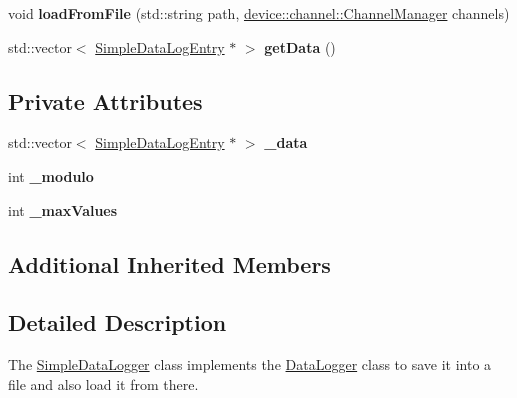 \begin{DoxyCompactItemize}
\item 
\hypertarget{classdrobot_1_1datalogger_1_1SimpleDataLogger_ae99d6654f53748fbf22835f75bca978f}{void {\bfseries load\-From\-File} (std\-::string path, \hyperlink{classdrobot_1_1device_1_1channel_1_1ChannelManager}{device\-::channel\-::\-Channel\-Manager} channels)}\label{classdrobot_1_1datalogger_1_1SimpleDataLogger_ae99d6654f53748fbf22835f75bca978f}

\item 
\hypertarget{classdrobot_1_1datalogger_1_1SimpleDataLogger_a9a22c15bff8f3faaaed8ebe32f95d4d1}{std\-::vector$<$ \hyperlink{structdrobot_1_1datalogger_1_1SimpleDataLogEntry}{Simple\-Data\-Log\-Entry} $\ast$ $>$ {\bfseries get\-Data} ()}\label{classdrobot_1_1datalogger_1_1SimpleDataLogger_a9a22c15bff8f3faaaed8ebe32f95d4d1}

\end{DoxyCompactItemize}
\subsection*{Private Attributes}
\begin{DoxyCompactItemize}
\item 
\hypertarget{classdrobot_1_1datalogger_1_1SimpleDataLogger_a3163664f8050b0a428f61c4c8849cb15}{std\-::vector$<$ \hyperlink{structdrobot_1_1datalogger_1_1SimpleDataLogEntry}{Simple\-Data\-Log\-Entry} $\ast$ $>$ {\bfseries \-\_\-data}}\label{classdrobot_1_1datalogger_1_1SimpleDataLogger_a3163664f8050b0a428f61c4c8849cb15}

\item 
\hypertarget{classdrobot_1_1datalogger_1_1SimpleDataLogger_af2603933a4ed7fb1231896fbee220752}{int {\bfseries \-\_\-modulo}}\label{classdrobot_1_1datalogger_1_1SimpleDataLogger_af2603933a4ed7fb1231896fbee220752}

\item 
\hypertarget{classdrobot_1_1datalogger_1_1SimpleDataLogger_afb8dceee27c888b76b5eec720f3cff3b}{int {\bfseries \-\_\-max\-Values}}\label{classdrobot_1_1datalogger_1_1SimpleDataLogger_afb8dceee27c888b76b5eec720f3cff3b}

\end{DoxyCompactItemize}
\subsection*{Additional Inherited Members}


\subsection{Detailed Description}
The \hyperlink{classdrobot_1_1datalogger_1_1SimpleDataLogger}{Simple\-Data\-Logger} class implements the \hyperlink{classdrobot_1_1datalogger_1_1DataLogger}{Data\-Logger} class to save it into a file and also load it from there. 

